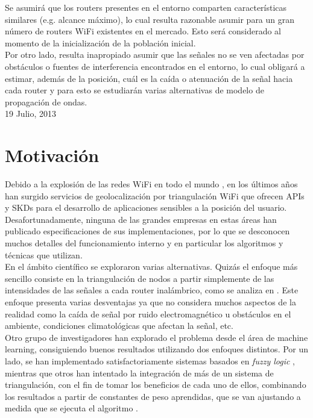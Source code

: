 \documentclass[journal]{IEEEtran}
\begin{document}
Se asumirá que los routers presentes en el entorno comparten características similares (e.g. alcance máximo), lo cual resulta razonable asumir para un gran número de routers WiFi existentes en el mercado. Esto será considerado al momento de la inicialización de la población inicial.\\

Por otro lado, resulta inapropiado asumir que las señales no se ven afectadas por obstáculos o fuentes de interferencia encontrados en el entorno, lo cual obligará a estimar, además de la posición, cuál es la caída o atenuación de la señal hacia cada router y para esto se estudiarán varias alternativas de modelo de propagación de ondas.\\

\hfill 19 Julio, 2013

\section{Motivación}

Debido a la explosión de las redes WiFi en todo el mundo \cite{wifi:coverage}, en los últimos años han surgido servicios de geolocalización por triangulación WiFi \cite{wifi:positioning} que ofrecen APIs \cite{google:maps} y SKDs  \cite{skyhook:location} para el desarrollo de aplicaciones sensibles a la posición del usuario.\\

Desafortunadamente, ninguna de las grandes empresas en estas áreas han publicado especificaciones de sus implementaciones, por lo que se desconocen muchos detalles del funcionamiento interno y en particular los algoritmos y técnicas que utilizan.\\

En el ámbito científico se exploraron varias alternativas. Quizás el enfoque más sencillo consiste en la triangulación de nodos a partir simplemente de las intensidades de las señales a cada router inalámbrico, como se analiza en \cite{simple:triangulation}. Este enfoque presenta varias desventajas ya que no considera muchos aspectos de la realidad como la caída de señal por ruido electromagnético u obstáculos en el ambiente, condiciones climatológicas que afectan la señal, etc.\\

Otro grupo de investigadores han explorado el problema desde el área de machine learning, consiguiendo buenos resultados utilizando dos enfoques distintos. Por un lado, se han implementado satisfactoriamente sistemas basados en \textit{fuzzy logic} \cite{fuzzy:logic:based:system}, mientras que otros han intentado la integración de más de un sistema de triangulación, con el fin de tomar los beneficios de cada uno de ellos, combinando los resultados a partir de constantes de peso aprendidas, que se van ajustando a medida que se ejecuta el algoritmo \cite{adaptive:weighting}.\\
\end{document}
